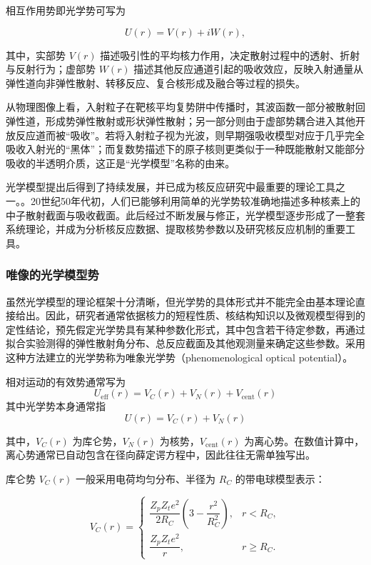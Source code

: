 相互作用势即光学势可写为

\begin{equation}
U(r)=V(r)+iW(r),
\end{equation}

其中，实部势 $V(r)$ 描述吸引性的平均核力作用，决定散射过程中的透射、折射与反射行为；虚部势 $W(r)$ 描述其他反应通道引起的吸收效应，反映入射通量从弹性道向非弹性散射、转移反应、复合核形成及融合等过程的损失。

从物理图像上看，入射粒子在靶核平均复势阱中传播时，其波函数一部分被散射回弹性道，形成势弹性散射或形状弹性散射；另一部分则由于虚部势耦合进入其他开放反应道而被“吸收”。若将入射粒子视为光波，则早期强吸收模型对应于几乎完全吸收入射光的“黑体”；而复数势描述下的原子核则更类似于一种既能散射又能部分吸收的半透明介质，这正是“光学模型”名称的由来。

光学模型提出后得到了持续发展，并已成为核反应研究中最重要的理论工具之一。。20世纪50年代初，人们已能够利用简单的光学势较准确地描述多种核素上的中子散射截面与吸收截面。此后经过不断发展与修正，光学模型逐步形成了一整套系统理论，并成为分析核反应数据、提取核势参数以及研究核反应机制的重要工具。

\subsubsection{唯像的光学模型势}

虽然光学模型的理论框架十分清晰，但光学势的具体形式并不能完全由基本理论直接给出。因此，研究者通常依据核力的短程性质、核结构知识以及微观模型得到的定性结论，预先假定光学势具有某种参数化形式，其中包含若干待定参数，再通过拟合实验测得的弹性散射角分布、总反应截面及其他观测量来确定这些参数。采用这种方法建立的光学势称为唯象光学势（phenomenological optical potential）。

相对运动的有效势通常写为
\[
U_{\mathrm{eff}}(r)=V_C(r)+V_N(r)+V_{\mathrm{cent}}(r)
\]
其中光学势本身通常指
\[
U(r)=V_C(r)+V_N(r)
\]

其中，$V_C(r)$ 为库仑势，$V_N(r)$ 为核势，$V_{\mathrm{cent}}(r)$ 为离心势。在数值计算中，离心势通常已自动包含在径向薛定谔方程中，因此往往无需单独写出。

库仑势 $V_C(r)$ 一般采用电荷均匀分布、半径为 $R_C$ 的带电球模型表示：

\begin{equation}
V_C(r)=
\begin{cases}
\dfrac{Z_p Z_t e^2}{2R_C}\left(3-\dfrac{r^2}{R_C^2}\right), & r<R_C,\\[8pt]
\dfrac{Z_p Z_t e^2}{r}, & r\ge R_C.
\end{cases}
\end{equation}

